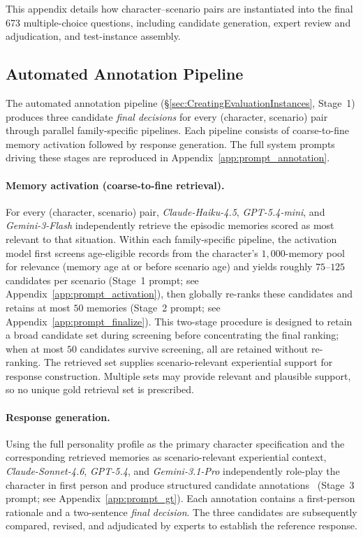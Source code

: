 \documentclass[11pt]{article}
\begin{document}
This appendix details how character--scenario pairs are instantiated into the final 673 multiple-choice questions, including candidate generation, expert review and adjudication, and test-instance assembly.

\subsection{Automated Annotation Pipeline}
\label{app:annotation}

The automated annotation pipeline (\S\ref{sec:CreatingEvaluationInstances}, Stage~1) produces three candidate \textit{final decisions} for every (character, scenario) pair through parallel family-specific pipelines. Each pipeline consists of coarse-to-fine memory activation followed by response generation. The full system prompts driving these stages are reproduced in Appendix~\ref{app:prompt_annotation}.

\paragraph{Memory activation (coarse-to-fine retrieval).} For every (character, scenario) pair, \textit{Claude-Haiku-4.5}, \textit{GPT-5.4-mini}, and \textit{Gemini-3-Flash} independently retrieve the episodic memories scored as most relevant to that situation. Within each family-specific pipeline, the activation model first screens age-eligible records from the character's $1{,}000$-memory pool for relevance (memory age at or before scenario age) and yields roughly $75$--$125$ candidates per scenario (Stage~1 prompt; see Appendix~\ref{app:prompt_activation}), then globally re-ranks these candidates and retains at most $50$ memories (Stage~2 prompt; see Appendix~\ref{app:prompt_finalize}). This two-stage procedure is designed to retain a broad candidate set during screening before concentrating the final ranking; when at most $50$ candidates survive screening, all are retained without re-ranking. The retrieved set supplies scenario-relevant experiential support for response construction. Multiple sets may provide relevant and plausible support, so no unique gold retrieval set is prescribed.

\paragraph{Response generation.} Using the full personality profile as the primary character specification and the corresponding retrieved memories as scenario-relevant experiential context, \textit{Claude-Sonnet-4.6}, \textit{GPT-5.4}, and \textit{Gemini-3.1-Pro} independently role-play the character in first person and produce structured candidate annotations~\cite{anthropic2025haiku45,anthropic2026sonnet46,openai2026gpt54,google2025gemini3flash,google2026gemini31pro} (Stage~3 prompt; see Appendix~\ref{app:prompt_gt}). Each annotation contains a first-person rationale and a two-sentence \textit{final decision}. The three candidates are subsequently compared, revised, and adjudicated by experts to establish the reference response.
\end{document}
